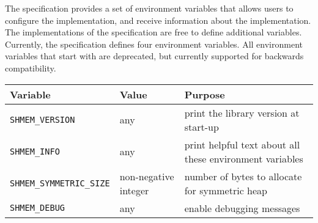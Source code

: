 The \openshmem specification provides a set of environment variables that allows
users to configure the \openshmem implementation, and receive information about
the implementation. The implementations of the specification are free to define
additional variables. Currently, the specification defines four environment
variables. All environment variables that start with  are
deprecated, but currently supported for backwards compatibility.
\medskip{}

\begin{tabular}{|l|l|l|}
\hline 
Variable & Value & Purpose\tabularnewline
\hline 
\hline 
\texttt{SHMEM\_VERSION} & any & print the library version at
\index{Environment Variables!SHMEM\_VERSION}
start-up\tabularnewline
\hline 
\texttt{SHMEM\_INFO} & any & print helpful text about all these environment
\index{Environment Variables!SHMEM\_INFO}
variables\tabularnewline
\hline 
\texttt{SHMEM\_SYMMETRIC\_SIZE} & non-negative integer & number of bytes to
\index{Environment Variables!SHMEM\_SYMMETRIC\_SIZE}
allocate for symmetric heap\tabularnewline
\hline 
\texttt{SHMEM\_DEBUG} & any & enable debugging messages
\index{Environment Variables!SHMEM\_DEBUG}
\tabularnewline
\hline 
\end{tabular}

\medskip{}
